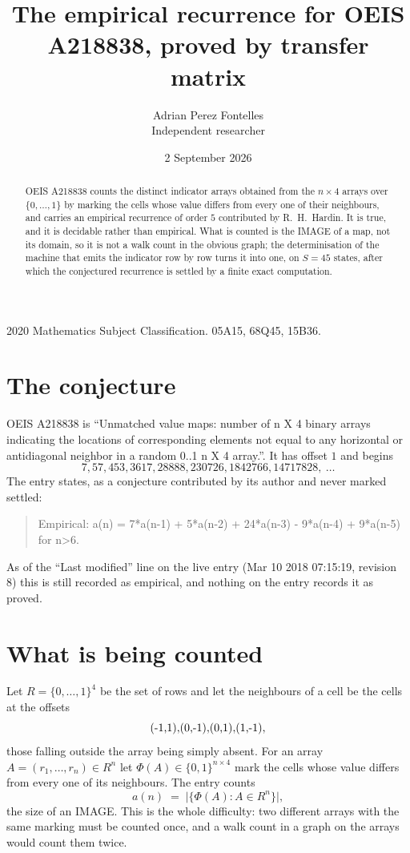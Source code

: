 \documentclass[11pt,a4paper]{article}
\title{The empirical recurrence for OEIS A218838, proved by transfer matrix}
\author{Adrian Perez Fontelles\\ \small Independent researcher}
\date{2 September 2026}
\theoremstyle{plain}
\theoremstyle{definition}
\begin{document}
\maketitle

\begin{abstract}
OEIS A218838 counts the distinct indicator arrays obtained from the $n\times4$ arrays over
$\{0,\dots,1\}$ by marking the cells whose value differs from every one of their neighbours, and carries an
empirical recurrence of order $5$ contributed by R.~H.~Hardin. It is true, and it is
decidable rather than empirical. What is counted is the IMAGE of a map, not its domain, so it
is not a walk count in the obvious graph; the determinisation of the machine that emits the
indicator row by row turns it into one, on $S=45$ states, after which the conjectured
recurrence is settled by a finite exact computation.
\end{abstract}

\noindent\small 2020 Mathematics Subject Classification. 05A15, 68Q45, 15B36.\normalsize

\section{The conjecture}

OEIS A218838 is ``Unmatched value maps: number of n X 4 binary arrays indicating the locations of corresponding elements not equal to any horizontal or antidiagonal neighbor in a random 0..1 n X 4 array.''. It has offset $1$ and begins
\[
7, 57, 453, 3617, 28888, 230726, 1842766, 14717828,\ \dots
\]
The entry states, as a conjecture contributed by its author and never marked settled:
\begin{quote}
Empirical: a(n) = 7*a(n-1) + 5*a(n-2) + 24*a(n-3) - 9*a(n-4) + 9*a(n-5) for n>6.
\end{quote}
As of the ``Last modified'' line on the live entry (Mar 10 2018 07:15:19, revision 8) this is still
recorded as empirical, and nothing on the entry records it as proved.

\section{What is being counted}

Let $R=\{0,\dots,1\}^{4}$ be the set of rows and let the neighbours of a cell be the
cells at the offsets
\[
$(-1,1)$, $(0,-1)$, $(0,1)$, $(1,-1)$,
\]
those falling outside the array being simply absent. For an array
$A=(r_1,\dots,r_n)\in R^n$ let $\Phi(A)\in\{0,1\}^{n\times4}$ mark the cells whose value
differs from every one of its neighbours. The entry counts
\[
a(n)\;=\;\bigl|\{\Phi(A):A\in R^n\}\bigr| ,
\]
the size of an IMAGE. This is the whole difficulty: two different arrays with the same marking
must be counted once, and a walk count in a graph on the arrays would count them twice.
\end{document}
